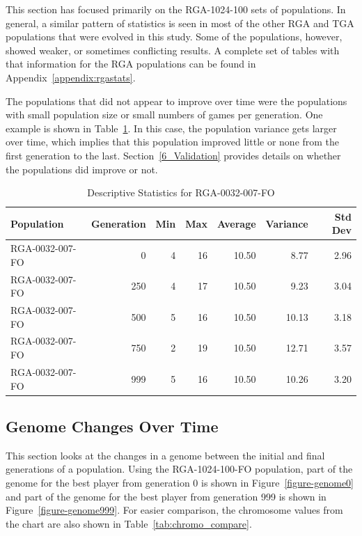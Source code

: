 This section has focused primarily on the RGA-1024-100 sets of populations. In
general, a similar pattern of statistics is seen in most of the other RGA and
TGA populations that were evolved in this study. Some of the populations,
however, showed weaker, or sometimes conflicting results. A complete set of
tables with that information for the RGA populations can be found in
Appendix~\ref{appendix:rgastats}.

The populations that did not appear to improve over time were the populations
with small population size or small numbers of games per generation. One example
is shown in Table~\ref{tab:6_RGA-0032-007-FO}. In this case, the population
variance gets larger over time, which implies that this population improved
little or none from the first generation to the last. Section~\ref{6_Validation}
provides details on whether the populations did improve or not.

\begin{table}[htbp]
  \centering
  \caption[RGA-0032-007-FO Statistics]{Descriptive Statistics for RGA-0032-007-FO}
    \begin{tabular}{lrrrrrr}
    \toprule
    Population &  Generation & Min    & Max    & Average & Variance & Std Dev \\
    \midrule
    RGA-0032-007-FO & 0      & 4      & 16     & 10.50  & 8.77   & 2.96 \\
    RGA-0032-007-FO & 250    & 4      & 17     & 10.50  & 9.23   & 3.04 \\
    RGA-0032-007-FO & 500    & 5      & 16     & 10.50  & 10.13  & 3.18 \\
    RGA-0032-007-FO & 750    & 2      & 19     & 10.50  & 12.71  & 3.57 \\
    RGA-0032-007-FO & 999    & 5      & 16     & 10.50  & 10.26  & 3.20 \\
    \bottomrule
    \end{tabular}
  \label{tab:6_RGA-0032-007-FO}%
\end{table}%

\subsection{Genome Changes Over Time}

This section looks at the changes in a genome between the initial and final
generations of a population. Using the RGA-1024-100-FO population, part of
the genome for the best player from generation 0 is shown in
Figure~\ref{figure-genome0} and part of the genome for the best player from
generation 999 is shown in Figure~\ref{figure-genome999}. For easier comparison,
the chromosome values from the chart are also shown in
Table~\ref{tab:chromo_compare}.

